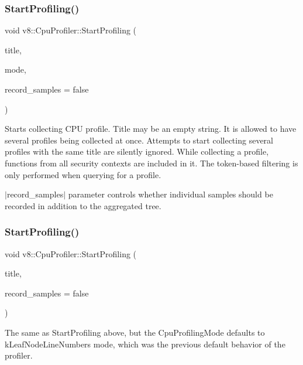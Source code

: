 \subsubsection{\texorpdfstring{Start\+Profiling()}{StartProfiling()}\hspace{0.1cm}{\footnotesize\ttfamily [1/2]}}
{\footnotesize\ttfamily void v8\+::\+Cpu\+Profiler\+::\+Start\+Profiling (\begin{DoxyParamCaption}\item[{\mbox{\hyperlink{classv8_1_1Local}{Local}}$<$ \mbox{\hyperlink{classv8_1_1String}{String}} $>$}]{title,  }\item[{Cpu\+Profiling\+Mode}]{mode,  }\item[{bool}]{record\+\_\+samples = {\ttfamily false} }\end{DoxyParamCaption})}

Starts collecting C\+PU profile. Title may be an empty string. It is allowed to have several profiles being collected at once. Attempts to start collecting several profiles with the same title are silently ignored. While collecting a profile, functions from all security contexts are included in it. The token-\/based filtering is only performed when querying for a profile.

$\vert$record\+\_\+samples$\vert$ parameter controls whether individual samples should be recorded in addition to the aggregated tree. \mbox{\label{classv8_1_1CpuProfiler_a7a9b75d3d7285d90344e1b8f14e97076}} 
\subsubsection{\texorpdfstring{Start\+Profiling()}{StartProfiling()}\hspace{0.1cm}{\footnotesize\ttfamily [2/2]}}
{\footnotesize\ttfamily void v8\+::\+Cpu\+Profiler\+::\+Start\+Profiling (\begin{DoxyParamCaption}\item[{\mbox{\hyperlink{classv8_1_1Local}{Local}}$<$ \mbox{\hyperlink{classv8_1_1String}{String}} $>$}]{title,  }\item[{bool}]{record\+\_\+samples = {\ttfamily false} }\end{DoxyParamCaption})}

The same as Start\+Profiling above, but the Cpu\+Profiling\+Mode defaults to k\+Leaf\+Node\+Line\+Numbers mode, which was the previous default behavior of the profiler. \mbox{\label{classv8_1_1CpuProfiler_a34acaa3b0e40cf2f92e9e6acb3fb5de7}} 
